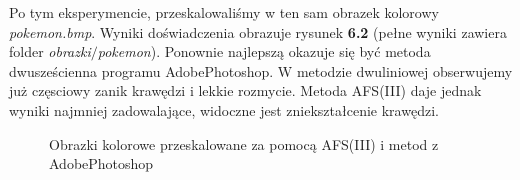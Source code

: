 Po tym eksperymencie, przeskalowaliśmy w ten sam obrazek kolorowy \textit{pokemon.bmp}.
Wyniki doświadczenia obrazuje rysunek \textbf{6.2} (pełne wyniki zawiera folder \textit{obrazki$\slash$pokemon}).
Ponownie najlepszą okazuje się być metoda dwusześcienna programu AdobePhotoshop. W metodzie dwuliniowej
obserwujemy już częsciowy zanik krawędzi i lekkie rozmycie. Metoda AFS(III) daje jednak
wyniki najmniej zadowalające, widoczne jest zniekształcenie krawędzi.
\begin{figure}[h!tb]
\begin{center}
\caption{Obrazki kolorowe przeskalowane za pomocą AFS(III) i metod z AdobePhotoshop}
\end{center}
\end{figure}

